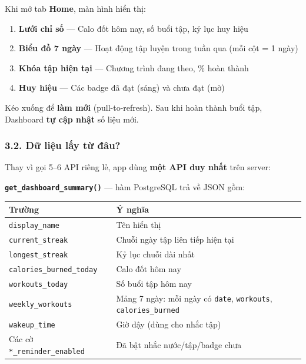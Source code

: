 \documentclass[12pt,a4paper]{article}
\begin{document}
Khi mở tab \textbf{Home}, màn hình hiển thị:

\begin{enumerate}
\def\labelenumi{\arabic{enumi}.}
\tightlist
\item
  \textbf{Lưới chỉ số} --- Calo đốt hôm nay, số buổi tập, kỷ lục huy
  hiệu
\item
  \textbf{Biểu đồ 7 ngày} --- Hoạt động tập luyện trong tuần qua (mỗi
  cột = 1 ngày)
\item
  \textbf{Khóa tập hiện tại} --- Chương trình đang theo, \% hoàn thành
\item
  \textbf{Huy hiệu} --- Các badge đã đạt (sáng) và chưa đạt (mờ)
\end{enumerate}

Kéo xuống để \textbf{làm mới} (pull-to-refresh). Sau khi hoàn thành buổi
tập, Dashboard \textbf{tự cập nhật} số liệu mới.

\subsubsection{3.2. Dữ liệu lấy từ
đâu?}\label{dux1eef-liux1ec7u-lux1ea5y-tux1eeb-ux111uxe2u}

Thay vì gọi 5--6 API riêng lẻ, app dùng \textbf{một API duy nhất} trên
server:

\textbf{\texttt{get\_dashboard\_summary()}} --- hàm PostgreSQL trả về
JSON gồm:

{\def\LTcaptype{none} %
\begin{longtable}[]{@{}
  >{\raggedright\arraybackslash}p{}
  >{\raggedright\arraybackslash}p{}@{}}
\toprule\noalign{}
\begin{minipage}[b]{\linewidth}\raggedright
Trường
\end{minipage} & \begin{minipage}[b]{\linewidth}\raggedright
Ý nghĩa
\end{minipage} \\
\midrule\noalign{}
\endhead
\bottomrule\noalign{}
\endlastfoot
\texttt{display\_name} & Tên hiển thị \\
\texttt{current\_streak} & Chuỗi ngày tập liên tiếp hiện tại \\
\texttt{longest\_streak} & Kỷ lục chuỗi dài nhất \\
\texttt{calories\_burned\_today} & Calo đốt hôm nay \\
\texttt{workouts\_today} & Số buổi tập hôm nay \\
\texttt{weekly\_workouts} & Mảng 7 ngày: mỗi ngày có \texttt{date},
\texttt{workouts}, \texttt{calories\_burned} \\
\texttt{wakeup\_time} & Giờ dậy (dùng cho nhắc tập) \\
Các cờ \texttt{*\_reminder\_enabled} & Đã bật nhắc nước/tập/badge
chưa \\
\end{longtable}
}
\end{document}

